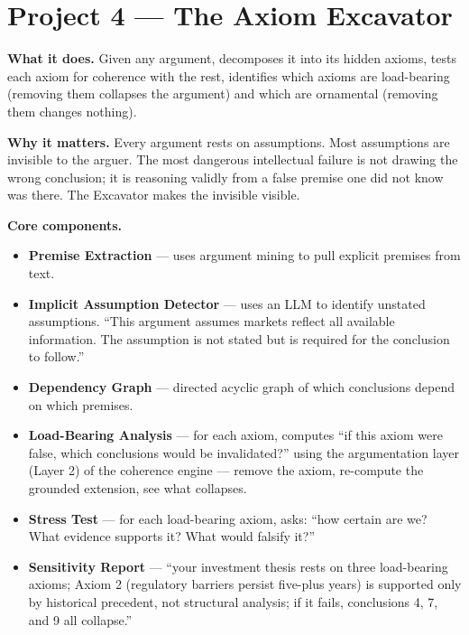 \documentclass[11pt,letterpaper]{article}
\begin{document}
\section{Project 4 --- The Axiom Excavator}

\textbf{What it does.} Given any argument, decomposes it into its hidden axioms, tests each axiom for coherence with the rest, identifies which axioms are load-bearing (removing them collapses the argument) and which are ornamental (removing them changes nothing).

\textbf{Why it matters.} Every argument rests on assumptions. Most assumptions are invisible to the arguer. The most dangerous intellectual failure is not drawing the wrong conclusion; it is reasoning validly from a false premise one did not know was there. The Excavator makes the invisible visible.

\textbf{Core components.}

\begin{itemize}[leftmargin=1.5em,itemsep=0.1em]
\item \textbf{Premise Extraction} --- uses argument mining to pull explicit premises from text.
\item \textbf{Implicit Assumption Detector} --- uses an LLM to identify unstated assumptions. ``This argument assumes markets reflect all available information. The assumption is not stated but is required for the conclusion to follow.''
\item \textbf{Dependency Graph} --- directed acyclic graph of which conclusions depend on which premises.
\item \textbf{Load-Bearing Analysis} --- for each axiom, computes ``if this axiom were false, which conclusions would be invalidated?'' using the argumentation layer (Layer 2) of the coherence engine --- remove the axiom, re-compute the grounded extension, see what collapses.
\item \textbf{Stress Test} --- for each load-bearing axiom, asks: ``how certain are we? What evidence supports it? What would falsify it?''
\item \textbf{Sensitivity Report} --- ``your investment thesis rests on three load-bearing axioms; Axiom 2 (regulatory barriers persist five-plus years) is supported only by historical precedent, not structural analysis; if it fails, conclusions 4, 7, and 9 all collapse.''
\end{itemize}
\end{document}
